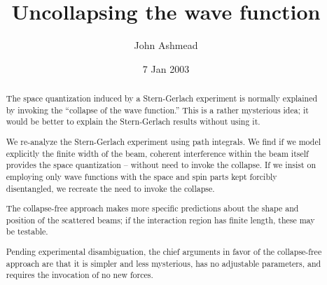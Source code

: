 \documentclass[aps,prl,superscriptaddress,12pt]{revtex4-2}
\begin{document}

\title{Uncollapsing the wave function}



\author{John Ashmead}


\date{ 7 Jan 2003}

\newcommand{\sg}{Stern-Gerlach }
\newcommand{\seqn}{Schr\"odinger equation }

\begin{abstract}

The space quantization induced by a \sg experiment is normally explained 
	by invoking the ``collapse of the wave function.'' 
This is a rather mysterious idea;
	 it would be better to explain the \sg results without using it.

We re-analyze the \sg experiment using path integrals.  
We find if we model explicitly the finite width of the beam, 
	coherent interference within the beam itself provides the space quantization
	-- without need to invoke the collapse.  
If we insist on employing only wave functions 
	with the space and spin parts kept forcibly disentangled, 
	we recreate the need to invoke the collapse. 

The collapse-free approach makes more specific predictions about the shape and position 
	of the scattered beams; 
	if the interaction region has finite length, these may be testable.

Pending experimental disambiguation, 
	the chief arguments in favor of the collapse-free approach are that it is simpler 
	and less mysterious, 
	has no adjustable parameters, 
	and requires the invocation of no new forces.

\end{abstract}
\end{document}
